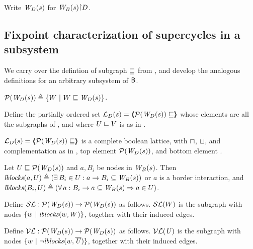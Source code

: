 Write $\lwfg{B}{s}{\DS}$ for $\wfg{B}{s} \pj \DS$.
\ed


%
\subsection{Fixpoint characterization of  supercycles in a  subsystem}

\label{s:local.fixpoint}

We carry over the defintion of subgraph $\subg$ from , and develop the analogous definitions for an arbitrary subsystem of $\B$.


 \label{defn:wsetOfSubgraphsLoc}
$\lwfgS{B}{s}{\DS} \df  \set{ W \stt W \subg \lwfg{B}{s}{\DS} }$.
\ed

 \label{defn:wflatticeLoc}
Define the partially ordered set 
$\llat{\B}{s}{\DS}  = \tpl{ \lwfgS{B}{s}{\DS}  \subg }$ 
whose elements are all the subgraphs of 
, and where  $U \subg V$ is as in .   
\ed


\bp \label{prop:isALatticeLoc}
$\llat{\B}{s}{\DS}  = \tpl{ \lwfgS{B}{s}{\DS}  \subg }$
 is a complete boolean lattice, with $\meet$, $\join$, and complementation as in 
, top element $\lwfgS{B}{s}{\DS}$, and bottom element \ewfg.
\ep


 \label{defn:blocksLoc}
Let $U \subg \lwfgS{B}{s}{\DS}$ and $a, B_i$ be nodes in $\wfg{B}{s}$. Then 
$\lblocks{a}{U} \df (\ex B_i \in U : a \ar B_i \sub \wfg{B}{s})$ or $a$ is a border interaction, and 
$\lblocks{B_i}{U} \df (\fa a : B_i \ar a \sub\wfg{B}{s} \imp a \in U)$.
\ed



\bd \label{defn:scFixL}
Define $\lSFs:  \lwfgS{B}{s}{\DS}  \to  \lwfgS{B}{s}{\DS}$ as follows.
$\lSF{W}$ is the subgraph with nodes $\set{w \stt \lblocks{w}{W} }$, together with their induced edges.
\ed


\bd \label{defn:violFixL}
Define $\lVFs: \lwfgS{B}{s}{\DS}  \to  \lwfgS{B}{s}{\DS}$ as follows.
$\lVF{\US}$ is the subgraph with nodes $\set{w \stt \neg \lblocks{w}{\compl{\US}} }$, together with their induced edges.
\ed


